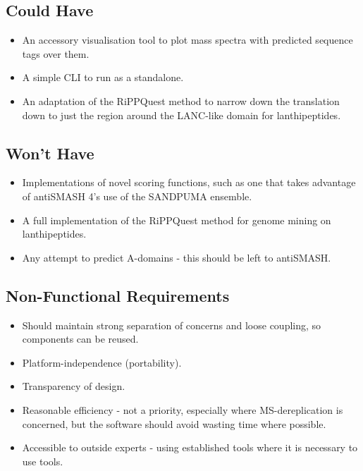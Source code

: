 \documentclass{l4proj}
\begin{document}
\subsection{Could Have}

\begin{itemize}
\item An accessory visualisation tool to plot mass spectra with predicted sequence tags over them.
\item A simple CLI to run as a standalone.
\item An adaptation of the RiPPQuest method to narrow down the translation down to just the region around the LANC-like domain for lanthipeptides.
\end{itemize}

\subsection{Won't Have}

\begin{itemize}
\item Implementations of novel scoring functions, such as one that takes advantage of antiSMASH 4's use of the SANDPUMA ensemble.
\item A full implementation of the RiPPQuest method for genome mining on lanthipeptides.
\item Any attempt to predict A-domains - this should be left to antiSMASH.
\end{itemize}

\subsection{Non-Functional Requirements}

\begin{itemize}
\item Should maintain strong separation of concerns and loose coupling, so components can be reused.
\item Platform-independence (portability).
\item Transparency of design.
\item Reasonable efficiency - not a priority, especially where MS-dereplication is concerned, but the software should avoid wasting time where possible.
\item Accessible to outside experts - using established tools where it is necessary to use tools.
\end{itemize}

\end{document}
